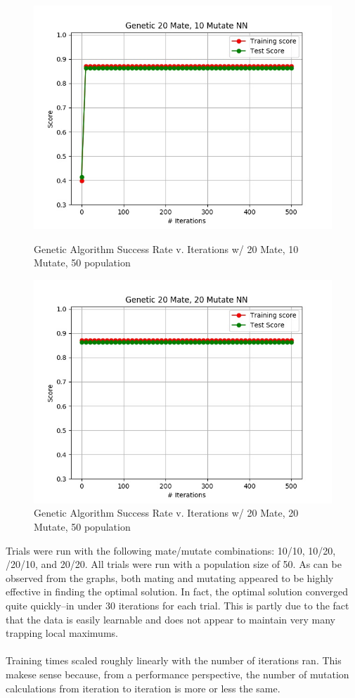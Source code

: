 \documentclass[h]{article}
\begin{document}
 \begin{figure}[H]
      \includegraphics[width=1\textwidth,keepaspectratio]{genetic_20_mate,_10_mutate_nn.jpg} 
      \caption*{Genetic Algorithm Success Rate v. Iterations w/ 20 Mate, 10 Mutate,  50 population} 
   \endminipage\hfill
      \includegraphics[width=1\textwidth,keepaspectratio]{genetic_20_mate,_20_mutate_nn.jpg} 
      \caption*{Genetic Algorithm Success Rate v. Iterations w/ 20 Mate, 20 Mutate, 50 population} 
   \endminipage\hfill
\end{figure}

Trials were run with the following mate/mutate combinations:  10/10, 10/20, 
/20/10, and 20/20.  All trials were run with a population size of 50.  As can be 
observed from the graphs, both mating and mutating appeared to be highly 
effective in finding the optimal solution.  In fact, the optimal solution 
converged quite quickly--in under 30 iterations for each trial.  This is partly 
due to the fact that the data is easily learnable and does not appear to 
maintain very many trapping local maximums.
\\ \\
Training times scaled roughly linearly with the number of iterations ran.  This 
makese sense because, from a performance perspective, the number of mutation 
calculations from iteration to iteration is more or less the same.
\end{document}
